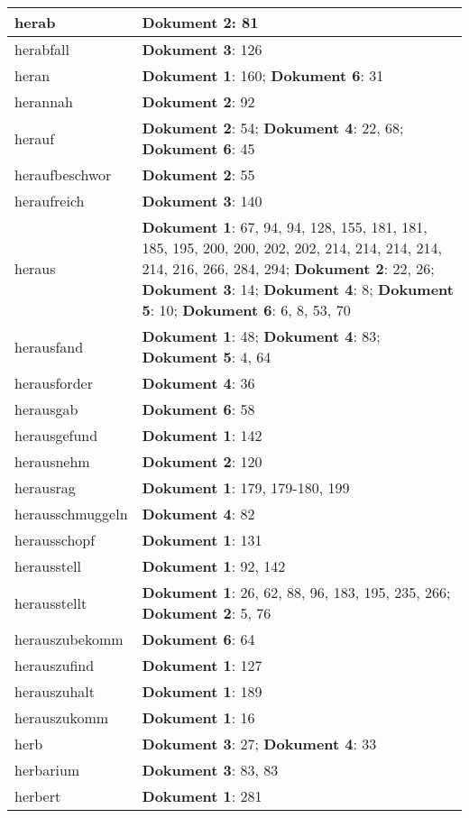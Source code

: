 \documentclass[a5paper]{article}
\begin{document}
\begin{longtable}[l]{|l|p{3in}|}
\hline
herab & \textbf{Dokument 2}: 81 \\
\hline
herabfall & \textbf{Dokument 3}: 126 \\
\hline
heran & \textbf{Dokument 1}: 160; \textbf{Dokument 6}: 31 \\
\hline
herannah & \textbf{Dokument 2}: 92 \\
\hline
herauf & \textbf{Dokument 2}: 54; \textbf{Dokument 4}: 22, 68; \textbf{Dokument 6}: 45 \\
\hline
heraufbeschwor & \textbf{Dokument 2}: 55 \\
\hline
heraufreich & \textbf{Dokument 3}: 140 \\
\hline
heraus & \textbf{Dokument 1}: 67, 94, 94, 128, 155, 181, 181, 185, 195, 200, 200, 202, 202, 214, 214, 214, 214, 214, 216, 266, 284, 294; \textbf{Dokument 2}: 22, 26; \textbf{Dokument 3}: 14; \textbf{Dokument 4}: 8; \textbf{Dokument 5}: 10; \textbf{Dokument 6}: 6, 8, 53, 70 \\
\hline
herausfand & \textbf{Dokument 1}: 48; \textbf{Dokument 4}: 83; \textbf{Dokument 5}: 4, 64 \\
\hline
herausforder & \textbf{Dokument 4}: 36 \\
\hline
herausgab & \textbf{Dokument 6}: 58 \\
\hline
herausgefund & \textbf{Dokument 1}: 142 \\
\hline
herausnehm & \textbf{Dokument 2}: 120 \\
\hline
herausrag & \textbf{Dokument 1}: 179, 179-180, 199 \\
\hline
herausschmuggeln & \textbf{Dokument 4}: 82 \\
\hline
herausschopf & \textbf{Dokument 1}: 131 \\
\hline
herausstell & \textbf{Dokument 1}: 92, 142 \\
\hline
herausstellt & \textbf{Dokument 1}: 26, 62, 88, 96, 183, 195, 235, 266; \textbf{Dokument 2}: 5, 76 \\
\hline
herauszubekomm & \textbf{Dokument 6}: 64 \\
\hline
herauszufind & \textbf{Dokument 1}: 127 \\
\hline
herauszuhalt & \textbf{Dokument 1}: 189 \\
\hline
herauszukomm & \textbf{Dokument 1}: 16 \\
\hline
herb & \textbf{Dokument 3}: 27; \textbf{Dokument 4}: 33 \\
\hline
herbarium & \textbf{Dokument 3}: 83, 83 \\
\hline
herbert & \textbf{Dokument 1}: 281 \\

\end{longtable}
\end{document}
